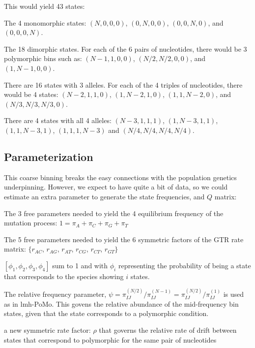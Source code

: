 \documentclass{llncs}
\begin{document}
This would yield 43 states:
\begin{compactenum}
    \item The 4 monomorphic states: $(N,0,0,0)$, $(0,N,0,0)$, $(0,0,N,0)$, and $(0,0,0,N)$.
    \item The 18 dimorphic states. For each of the 6 pairs of nucleotides, there would be 3 polymorphic bins such as:
    $(N-1, 1, 0, 0)$, $(N/2,N/2,0,0)$, and $(1, N-1, 0, 0)$.
    \item There are 16 states with 3 alleles. For each of the 4 triples of nucleotides, there would be 4 states:
    $(N-2, 1, 1, 0)$, $(1, N-2, 1, 0)$, $(1, 1, N-2, 0)$, and $(N/3, N/3, N/3, 0)$.
    \item There are 4 states with all 4 alleles:
    $(N-3, 1, 1, 1)$, $(1, N-3, 1, 1)$, $(1, 1, N-3, 1)$, $(1, 1, 1, N-3)$ and $(N/4, N/4, N/4, N/4)$.
\end{compactenum}



\subsection*{Parameterization}

This coarse binning breaks the easy connections with the population genetics underpinning.
However, we expect to have quite a bit of data, so we
could estimate an extra parameter to generate the state frequencies, and $Q$ matrix:
\begin{compactitem}
    \item The 3 free parameters needed to yield the 4 equilibrium frequency of the mutation process: $1 = \pi_A + \pi_C + \pi_G + \pi_T$
    \item The 5 free parameters needed to yield the 6 symmetric factors of the GTR rate matrix:  $\{r_{AC}$, $r_{AG}$, $r_{AT}$, $r_{CG}$, $r_{CT}$, $r_{GT}\}$
    \item $[\phi_1, \phi_2, \phi_3, \phi_4]$ sum to 1 and with $\phi_i$ representing the probability of being
    a state that corresponds to the species showing $i$ states. 
    \item The relative frequency parameter, $\psi = \pi_{IJ}^{(N/2)}/\pi_{IJ}^{(N-1)} = \pi_{IJ}^{(N/2)}/\pi_{IJ}^{(1)}$ is used as in lmh-PoMo.
    This govens the relative abundance of the mid-frequency bin states, given that 
    the state corresponds to a polymorphic condition.
    \item a new symmetric rate factor: $\rho$ that governs the relative rate of drift between states that correspond to polymorphic for the same pair of nucleotides
\end{compactitem}
\end{document}
